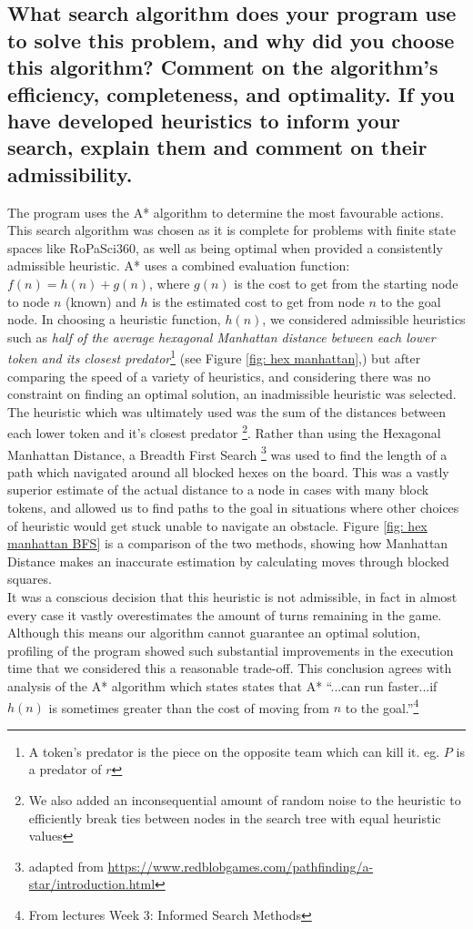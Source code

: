 \documentclass{article}
\begin{document}
\subsection*{What search algorithm does your program use to solve this problem, and why did you choose this algorithm? Comment on the algorithm’s efficiency, completeness, and optimality. If you have developed heuristics to inform your search, explain them and comment on their admissibility.}
The program uses the A* algorithm to determine the most favourable actions. This search algorithm was chosen as it is complete for problems with finite state spaces like RoPaSci360, as well as being optimal when provided a consistently admissible heuristic. A* uses a combined evaluation function: $f(n) = h(n) + g(n)$, where $g(n)$ is the cost to get from the starting node to node $n$ (known) and $h$ is the estimated cost to get from node $n$ to the goal node. In choosing a heuristic function, $h(n)$, we considered admissible heuristics such as \textit{half of the average hexagonal Manhattan distance between each lower token and its closest predator}\footnote{A token's predator is the piece on the opposite team which can kill it. eg. $P$ is a predator of $r$} (see Figure \ref{fig: hex manhattan},) but after comparing the speed of a variety of heuristics, and considering there was no constraint on finding an optimal solution, an inadmissible heuristic was selected.\\[2mm]
The heuristic which was ultimately used was the sum of the distances between each lower token and it's closest predator \footnote{We also added an inconsequential amount of random noise to the heuristic to efficiently break ties between nodes in the search tree with equal heuristic values}. Rather than using the Hexagonal Manhattan Distance, a Breadth First Search \footnote{adapted from \url{https://www.redblobgames.com/pathfinding/a-star/introduction.html}} was used to find the length of a path which navigated around all blocked hexes on the board. This was a vastly superior estimate of the actual distance to a node in cases with many block tokens, and allowed us to find paths to the goal in situations where other choices of heuristic would get stuck unable to navigate an obstacle. Figure \ref{fig: hex manhattan BFS} is a comparison of the two methods, showing how Manhattan Distance makes an inaccurate estimation by calculating moves through blocked squares.\\[2mm]
It was a conscious decision that this heuristic is not admissible, in fact in almost every case it vastly overestimates the amount of turns remaining in the game. Although this means our algorithm cannot guarantee an optimal solution, profiling of the program showed such substantial improvements in the execution time that we considered this a reasonable trade-off. This conclusion agrees with analysis of the A* algorithm which states states that A* ``...can run faster...if $h(n)$ is sometimes greater than the cost of moving from $n$ to the goal.''\footnote{From lectures Week 3: Informed Search Methods}
\end{document}
